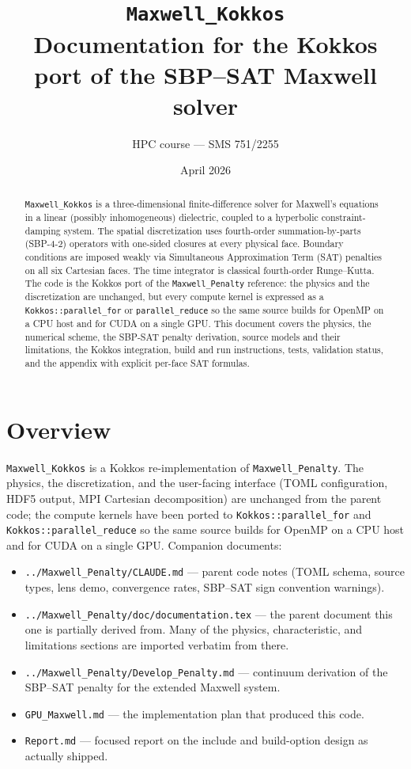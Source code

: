 \documentclass[11pt]{article}
\title{\textbf{\texttt{Maxwell\_Kokkos}}\\
       Documentation for the Kokkos port of the SBP--SAT Maxwell solver}
\author{HPC course --- SMS 751/2255}
\date{April 2026}
\begin{document}
\maketitle
\tableofcontents
\bigskip

\begin{abstract}
\texttt{Maxwell\_Kokkos} is a three-dimensional finite-difference
solver for Maxwell's equations in a linear (possibly inhomogeneous)
dielectric, coupled to a hyperbolic constraint-damping system.  The
spatial discretization uses fourth-order summation-by-parts (SBP-4-2)
operators with one-sided closures at every physical face.  Boundary
conditions are imposed weakly via Simultaneous Approximation Term
(SAT) penalties on all six Cartesian faces.  The time integrator is
classical fourth-order Runge--Kutta.  The code is the Kokkos port of
the \texttt{Maxwell\_Penalty} reference: the physics and the
discretization are unchanged, but every compute kernel is expressed
as a \texttt{Kokkos::parallel\_for} or \texttt{parallel\_reduce} so
the same source builds for OpenMP on a CPU host and for CUDA on a
single GPU.  This document covers the physics, the numerical scheme,
the SBP-SAT penalty derivation, source models and their limitations,
the Kokkos integration, build and run instructions, tests, validation
status, and the appendix with explicit per-face SAT formulas.
\end{abstract}

\section{Overview}

\texttt{Maxwell\_Kokkos} is a Kokkos re-implementation of
\texttt{Maxwell\_Penalty}.  The physics, the
discretization, and the user-facing interface (TOML configuration,
HDF5 output, MPI Cartesian decomposition) are unchanged from the
parent code; the compute kernels have been ported to
\texttt{Kokkos::parallel\_for} and \texttt{Kokkos::parallel\_reduce}
so the same source builds for OpenMP on a CPU host and for CUDA on
a single GPU.  Companion documents:

\begin{itemize}[itemsep=2pt,topsep=2pt]
  \item \texttt{../Maxwell\_Penalty/CLAUDE.md} --- parent code
        notes (TOML schema, source types, lens demo, convergence
        rates, SBP--SAT sign convention warnings).
  \item \texttt{../Maxwell\_Penalty/doc/documentation.tex}
        --- the parent document this one is partially derived from.
        Many of the physics, characteristic, and limitations
        sections are imported verbatim from there.
  \item \texttt{../Maxwell\_Penalty/Develop\_Penalty.md} ---
        continuum derivation of the SBP--SAT penalty for the extended
        Maxwell system.
  \item \texttt{GPU\_Maxwell.md} --- the implementation plan that
        produced this code.
  \item \texttt{Report.md} --- focused report on the include and
        build-option design as actually shipped.
\end{itemize}
\end{document}
